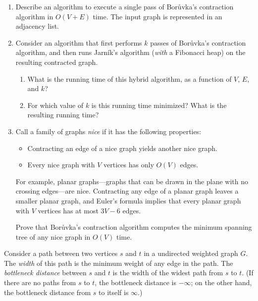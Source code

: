 \begin{exercises}
\begin{enumerate}
\item Describe an algorithm to execute a single pass of Borůvka’s contraction algorithm in $O(V+E)$ time. The input graph is represented in an adjacency list.

\item Consider an algorithm that first performs $k$ passes of Borůvka’s contraction algorithm, and then runs Jarník’s algorithm (\textit{with} a Fibonacci heap) on the resulting contracted graph.

\begin{enumerate}[label=\roman*.,ref=\theenumii\roman*]
\item What is the running time of this hybrid algorithm, as a function of $V$, $E$, and $k$?

\item For which value of $k$ is this running time minimized? What is the resulting running time?

\end{enumerate}
\item Call a family of graphs \textit{nice} if it has the following properties:

\begin{itemize}
\item Contracting an edge of a nice graph yields another nice graph.
\item Every nice graph with $V$ vertices has only $O(V)$ edges.
\end{itemize}

\noindent For example, planar graphs—graphs that can be drawn in the plane with no crossing edges—are nice. Contracting any edge of a planar graph leaves a smaller planar graph, and Euler’s formula implies that every planar graph with $V$ vertices has at most $3V-6$ edges.

Prove that Borůvka’s contraction algorithm computes the minimum spanning tree of any nice graph in $O(V)$ time.

\end{enumerate}

\item Consider a path between two vertices $s$ and $t$ in a undirected weighted graph $G$. The \textit{width} of this path is the minimum weight of any edge in the path. The \textit{bottleneck distance} between $s$ and $t$ is the width of the widest path from $s$ to $t$. (If there are no paths from $s$ to $t$, the bottleneck distance is $-\infty$; on the other hand, the bottleneck distance from $s$ to itself is $\infty$.)


\end{exercises}
